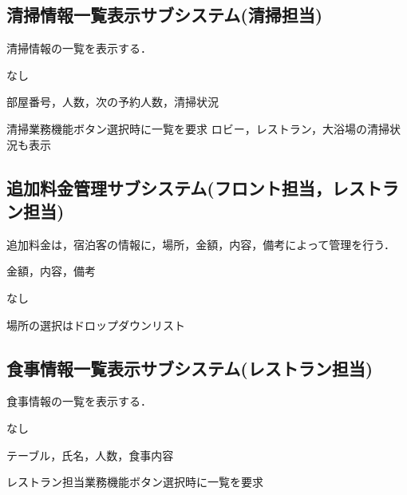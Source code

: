 \subsection{清掃情報一覧表示サブシステム(清掃担当)}
清掃情報の一覧を表示する．
\begin{description} \setlength{\leftskip}{0.5cm}
\item[入力]なし
\item[出力]部屋番号，人数，次の予約人数，清掃状況
\item[備考]清掃業務機能ボタン選択時に一覧を要求
    ロビー，レストラン，大浴場の清掃状況も表示
\end{description}

\subsection{追加料金管理サブシステム(フロント担当，レストラン担当)}
追加料金は，宿泊客の情報に，場所，金額，内容，備考によって管理を行う．
\begin{description} \setlength{\leftskip}{0.5cm}
\item[入力]金額，内容，備考
\item[出力]なし
\item[備考]場所の選択はドロップダウンリスト
\end{description}

\subsection{食事情報一覧表示サブシステム(レストラン担当)}
食事情報の一覧を表示する．
\begin{description} \setlength{\leftskip}{0.5cm}
\item[入力]なし
\item[出力]テーブル，氏名，人数，食事内容
\item[備考]レストラン担当業務機能ボタン選択時に一覧を要求
\end{description}

